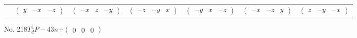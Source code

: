 \documentclass[fleqn,9pt,landscape]{jsarticle}
\begin{document}
\begin{center}
\begin{longtable}{ccccccc}
& $ \begin{pmatrix} y & - x & - z \end{pmatrix} $ & $ \begin{pmatrix} - x & z & - y \end{pmatrix} $ & $ \begin{pmatrix} - z & - y & x \end{pmatrix} $ & $ \begin{pmatrix} - y & x & - z \end{pmatrix} $ & $ \begin{pmatrix} - x & - z & y \end{pmatrix} $ & $ \begin{pmatrix} z & - y & - x \end{pmatrix} $ \\
\end{longtable}
\end{center}
\newpage
No. 218\quad$T_{d}^{4}$\quad$P-43n$\quad[ cubic ]\quad$+\begin{pmatrix} 0 & 0 & 0 \end{pmatrix}$
\end{document}
